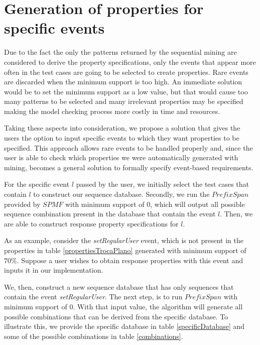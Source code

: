 \section{Generation of properties for specific events}
\label{sec-genpropspecific}

Due to the fact the only the patterns returned by the sequential mining are considered to derive the property specifications, only the events that appear more often in the test cases are going to be selected to create properties. Rare events are discarded when the minimum support is too high. An immediate solution would be to set the minimum support as a low value, but that would cause too many patterns to be selected and many irrelevant properties may be specified making the model checking process more costly in time and resources.

Taking these aspects into consideration, we propose a solution that gives the users the option to input specific events to which they want properties to be specified. This approach allows rare events to be handled properly and, since the user is able to check which properties we were automatically generated with mining, becomes a general solution to formally specify event-based requirements.

For the specific event $l$ passed by the user, we initially select the test cases that contain $l$ to construct our sequence database. Secondly, we run the $PrefixSpan$ provided by $SPMF$ with minimum support of $0$, which will output all possible sequence combination present in the database that contain the event $l$. Then, we are able to construct response property specifications for $l$.

As an example, consider the \textit{setRegularUser} event, which is not present in the properties in table \ref{propertiesTrocaPlano} generated with minimum support of $70\%$. Suppose a user wishes to obtain response properties with this event and inputs it in our implementation.

We, then, construct a new sequence database that has only sequences that contain the event \textit{setRegularUser}. The next step, is to run $PrefixSpan$ with minimum support of 0. With that input value, the algorithm will generate all possible combinations that can be derived from the specific database. To illustrate this, we provide the specific database in table \ref{specificDatabase} and some of the possible combinations in table \ref{combinations}.

